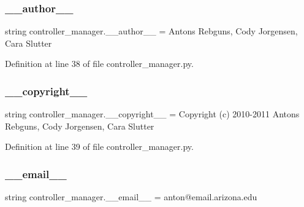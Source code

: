 \subsubsection{\texorpdfstring{\+\_\+\+\_\+author\+\_\+\+\_\+}{\_\_author\_\_}}
{\footnotesize\ttfamily string controller\+\_\+manager.\+\_\+\+\_\+author\+\_\+\+\_\+ = \textquotesingle{}Antons Rebguns, Cody Jorgensen, Cara Slutter\textquotesingle{}\hspace{0.3cm}{\ttfamily [private]}}



Definition at line 38 of file controller\+\_\+manager.\+py.

\mbox{\label{namespacecontroller__manager_a6cf02b8fd6792f2e424072116dd8675e}} 
\subsubsection{\texorpdfstring{\+\_\+\+\_\+copyright\+\_\+\+\_\+}{\_\_copyright\_\_}}
{\footnotesize\ttfamily string controller\+\_\+manager.\+\_\+\+\_\+copyright\+\_\+\+\_\+ = \textquotesingle{}Copyright (c) 2010-\/2011 Antons Rebguns, Cody Jorgensen, Cara Slutter\textquotesingle{}\hspace{0.3cm}{\ttfamily [private]}}



Definition at line 39 of file controller\+\_\+manager.\+py.

\mbox{\label{namespacecontroller__manager_a127055555ac1277166f13e7c80b9eecd}} 
\subsubsection{\texorpdfstring{\+\_\+\+\_\+email\+\_\+\+\_\+}{\_\_email\_\_}}
{\footnotesize\ttfamily string controller\+\_\+manager.\+\_\+\+\_\+email\+\_\+\+\_\+ = \textquotesingle{}anton@email.\+arizona.\+edu\textquotesingle{}\hspace{0.3cm}{\ttfamily [private]}}



